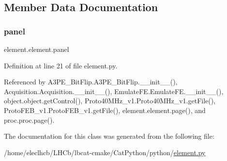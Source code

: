 \subsection{Member Data Documentation}
\mbox{\label{classelement_1_1element_a0fce7cee12f437717c882d0965e46235}} 
\subsubsection{\texorpdfstring{panel}{panel}}
{\footnotesize\ttfamily element.\+element.\+panel}



Definition at line 21 of file element.\+py.



Referenced by A3\+P\+E\+\_\+\+Bit\+Flip.\+A3\+P\+E\+\_\+\+Bit\+Flip.\+\_\+\+\_\+init\+\_\+\+\_\+(), Acquisition.\+Acquisition.\+\_\+\+\_\+init\+\_\+\+\_\+(), Emulate\+F\+E.\+Emulate\+F\+E.\+\_\+\+\_\+init\+\_\+\+\_\+(), object.\+object.\+get\+Control(), Proto40\+M\+Hz\+\_\+v1.\+Proto40\+M\+Hz\+\_\+v1.\+get\+File(), Proto\+F\+E\+B\+\_\+v1.\+Proto\+F\+E\+B\+\_\+v1.\+get\+File(), element.\+element.\+page(), and proc.\+proc.\+page().



The documentation for this class was generated from the following file\+:\begin{DoxyCompactItemize}
\item 
/home/eleclhcb/\+L\+H\+Cb/lbcat-\/cmake/\+Cat\+Python/python/\hyperlink{element_8py}{element.\+py}\end{DoxyCompactItemize}
